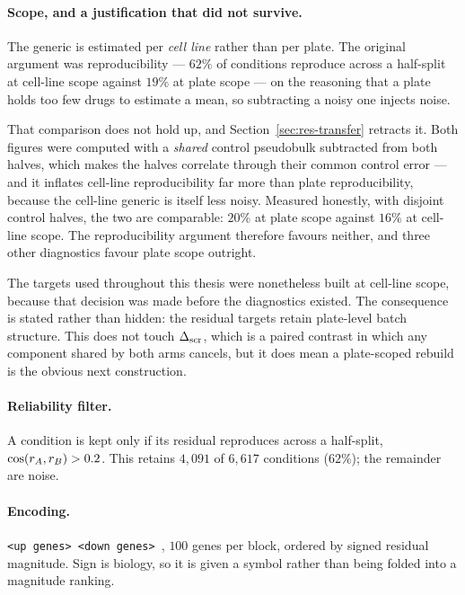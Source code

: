 \paragraph{Scope, and a justification that did not survive.} The generic is estimated per
\emph{cell line} rather than per plate. The original argument was reproducibility --- $62\%$ of
conditions reproduce across a half-split at cell-line scope against $19\%$ at plate scope --- on the
reasoning that a plate holds too few drugs to estimate a mean, so subtracting a noisy one injects
noise.

That comparison does not hold up, and Section~\ref{sec:res-transfer} retracts it. Both figures were
computed with a \emph{shared} control pseudobulk subtracted from both halves, which makes the halves
correlate through their common control error --- and it inflates cell-line reproducibility far more
than plate reproducibility, because the cell-line generic is itself less noisy. Measured honestly,
with disjoint control halves, the two are comparable: $20\%$ at plate scope against $16\%$ at
cell-line scope. The reproducibility argument therefore favours neither, and three other diagnostics
favour plate scope outright.

The targets used throughout this thesis were nonetheless built at cell-line scope, because that
decision was made before the diagnostics existed. The consequence is stated rather than hidden: the
residual targets retain plate-level batch structure. This does not touch $\Delta_{\textrm{scr}}$, which is a paired
contrast in which any component shared by both arms cancels, but it does mean a plate-scoped rebuild
is the obvious next construction.

\paragraph{Reliability filter.} A condition is kept only if its residual reproduces across a
half-split, $\cos(r_A, r_B) > 0.2$. This retains $4{,}091$ of $6{,}617$ conditions
($62\%$); the remainder are noise.

\paragraph{Encoding.} \texttt{<up genes> \DOWN{} <down genes> \ENDCELL}, $100$ genes per block,
ordered by signed residual magnitude. Sign is biology, so it is given a symbol rather than being
folded into a magnitude ranking.



